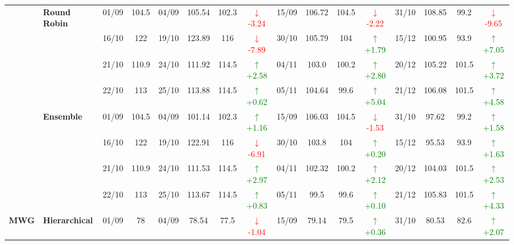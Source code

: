 {\begin{longtable}{llcc|cccc|cccc|cccc}
& \textbf{Round Robin}
& 01/09 & 104.5 & 04/09 & 105.54 & 102.3 & \textcolor{red}{\(\downarrow\)-3.24} & 15/09 & 106.72 & 104.5 & \textcolor{red}{\(\downarrow\)-2.22} & 31/10 & 108.85 & 99.2 & \textcolor{red}{\(\downarrow\)-9.65} \\

&
& 16/10 & 122 & 19/10 & 123.89 & 116 & \textcolor{red}{\(\downarrow\)-7.89} & 30/10 & 105.79 & 104 & \textcolor{green}{\(\uparrow\)+1.79} & 15/12 & 100.95 & 93.9 & \textcolor{green}{\(\uparrow\)+7.05} \\

&
& 21/10 & 110.9 & 24/10 & 111.92 & 114.5 & \textcolor{green}{\(\uparrow\)+2.58} & 04/11 & 103.0 & 100.2 & \textcolor{green}{\(\uparrow\)+2.80} & 20/12 & 105.22 & 101.5 & \textcolor{green}{\(\uparrow\)+3.72} \\

&
& 22/10 & 113 & 25/10 & 113.88 & 114.5 & \textcolor{green}{\(\uparrow\)+0.62} & 05/11 & 104.64 & 99.6 & \textcolor{green}{\(\uparrow\)+5.04} & 21/12 & 106.08 & 101.5 & \textcolor{green}{\(\uparrow\)+4.58} \\
\cmidrule(lr){2-16}


& \textbf{Ensemble}
& 01/09 & 104.5 & 04/09 & 101.14 & 102.3 & \textcolor{green}{\(\uparrow\)+1.16} & 15/09 & 106.03 & 104.5 & \textcolor{red}{\(\downarrow\)-1.53} & 31/10 & 97.62 & 99.2 & \textcolor{green}{\(\uparrow\)+1.58} \\

&
& 16/10 & 122 & 19/10 & 122.91 & 116 & \textcolor{red}{\(\downarrow\)-6.91} & 30/10 & 103.8 & 104 & \textcolor{green}{\(\uparrow\)+0.20} & 15/12 & 95.53 & 93.9 & \textcolor{green}{\(\uparrow\)+1.63} \\

&
& 21/10 & 110.9 & 24/10 & 111.53 & 114.5 & \textcolor{green}{\(\uparrow\)+2.97} & 04/11 & 102.32 & 100.2 & \textcolor{green}{\(\uparrow\)+2.12} & 20/12 & 104.03 & 101.5 & \textcolor{green}{\(\uparrow\)+2.53} \\

&
& 22/10 & 113 & 25/10 & 113.67 & 114.5 & \textcolor{green}{\(\uparrow\)+0.83} & 05/11 & 99.5 & 99.6 & \textcolor{green}{\(\uparrow\)+0.10} & 21/12 & 105.83 & 101.5 & \textcolor{green}{\(\uparrow\)+4.33} \\
\midrule




\multirow{12}{*}{\textbf{MWG}} 
& \textbf{Hierarchical}
& 01/09 & 78 & 04/09 & 78.54 & 77.5 & \textcolor{red}{\(\downarrow\)-1.04} & 15/09 & 79.14 & 79.5 & \textcolor{green}{\(\uparrow\)+0.36} & 31/10 & 80.53 & 82.6 & \textcolor{green}{\(\uparrow\)+2.07} \\


\end{longtable}}
